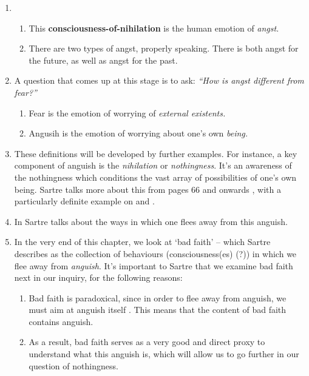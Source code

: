\begin{enumerate}
  \item {}
  \begin{enumerate}
    \item This \textbf{consciousness-of-nihilation} is the human emotion of \emph{angst}.
    \item There are two types of angst, properly speaking. There is both angst for the future, as well as angst for the past.
  \end{enumerate}
  \item A question that comes up at this stage is to ask: \emph{\enquote{How is angst different from \emph{fear}?}}
  \begin{enumerate}
    \item Fear is the emotion of worrying of \emph{external existents.}
    \item Angusih is the emotion of worrying about one's own \emph{being.}
  \end{enumerate}
  \item These definitions will be developed by further examples. For instance, a key component of anguish is the \emph{nihilation} or \emph{nothingness}. It's an awareness of the nothingness which conditions the vast array of possibilities of one's own being. Sartre talks more about this from pages 66 and onwards \autocite[66]{sartre}, with a particularly definite example on \autocite[71]{sartre} and \autocite[77]{sartre}.
  \item In \autocite[80]{sartre} Sartre talks about the ways in which one flees away from this anguish.
  \item In the very end of this chapter, we look at \enquote*{bad faith} -- which Sartre describes as the collection of behaviours (consciousness(es) (?)) in which we flee away from \emph{anguish}. It's important to Sartre that we examine bad faith next in our inquiry, for the following reasons:
  \begin{enumerate}
    \item Bad faith is paradoxical, since in order to flee away from anguish, we must aim at anguish itself \autocite[86]{sartre}. This means that the content of bad faith contains anguish.
    \item As a result, bad faith serves as a very good and direct proxy to understand what this anguish is, which will allow us to go further in our question of nothingness.

\end{enumerate}
\end{enumerate}
